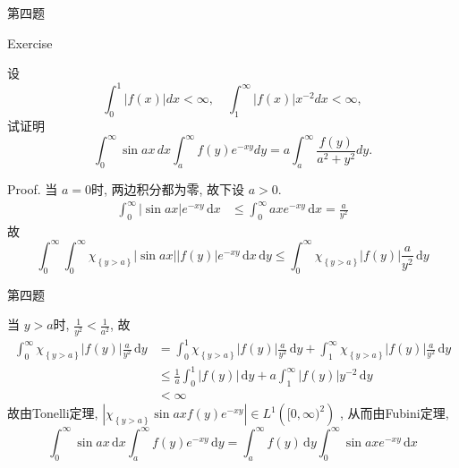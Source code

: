 \documentclass{beamer}
\begin{document}
\begin{frame}[fragile]{第四题}

\begin{block}{Exercise}

设
\[
\int_0^1|f(x)|dx<\infty,\quad\int_1^\infty|f(x)|x^{-2}dx<\infty,
\]
试证明
\[
\int_0^\infty\sin ax\,dx\int_a^\infty f(y)e^{-xy}dy
=a\int_a^\infty\frac{f(y)}{a^2+y^2}dy.
\]
\end{block}
Proof.  
当 \(  a= 0  \)时, 两边积分都为零, 故下设 \(  a> 0  \).  
\[
\begin{aligned}
\int_{0}^{\infty}\left| \sin ax \right|e^{-xy}\,\mathrm{d} x&\le \int_{0}^{\infty}axe^{-xy}\,\mathrm{d} x= \frac{a }{y^{2} } 
\end{aligned}   
\]故 \[
\int_{0}^{\infty}\int_{0}^{\infty}\chi _{\left\{ y> a \right\}}\left| \sin ax \right|\left| f\left( y \right)  \right|e^{-xy}\,\mathrm{d} x\,\mathrm{d} y\le \int_{0}^{\infty}\chi _{\left\{ y> a \right\}}  \left| f\left( y \right)  \right|\frac{a }{y^{2} }  \,\mathrm{d} y
\]
\end{frame}




\begin{frame}[fragile]{第四题}

   当 \(  y>  a  \)时, \(  \frac{1 }{y^{2} }< \frac{1 }{a^{2} }    \), 故  \[
\begin{aligned}
\int_{0}^{\infty}\chi _{\left\{ y> a \right\}}\left| f\left( y \right)  \right|\frac{a }{y^{2} }\,\mathrm{d} y&= \int_{0}^{1}\chi _{\left\{ y> a \right\}}\left| f\left( y \right)  \right|\frac{a }{y^{2} }\,\mathrm{d} y+ \int_{1}^{\infty}\chi _{\left\{ y> a \right\}}    \left| f\left( y \right)  \right|\frac{a }{y^{2} }\,\mathrm{d} y \\ 
 &\le \frac{1 }{a }\int_{0}^{1}\left| f\left( y \right)  \right|\,\mathrm{d} y+  a\int_{1}^{\infty}\left| f\left( y \right)  \right|y^{-2}   \,\mathrm{d} y\\ 
  &< \infty
\end{aligned}  
\]故由Tonelli定理,  \(  \left| \chi _{\left\{ y> a \right\}}\sin ax f\left( y \right)e^{-xy}  \right|\in L^{1}\left( [0,\infty)^{2} \right)    \) , 从而由Fubini定理, \[
\int_{0}^{\infty}\sin ax \,\mathrm{d} x\int_{a}^{\infty}f\left( y \right)e^{-xy}\,\mathrm{d} y= \int_{a}^{\infty}f\left( y \right)\,\mathrm{d} y \int_{0}^{\infty}\sin ax e^{-xy}\,\mathrm{d} x 
\]

\end{frame}
\end{document}
